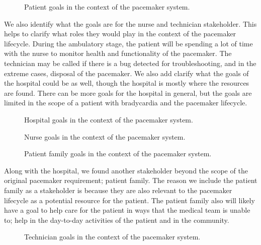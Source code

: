 \begin{figure}
	\centering
	
	\caption{Patient goals in the context of the pacemaker system.}
	\label{fig:patient_goals}
\end{figure}

We also identify what the goals are for the nurse and technician stakeholder. This helps to clarify what roles they would play in the context of the pacemaker lifecycle. During the ambulatory stage, the patient will be spending a lot of time with the nurse to monitor health and functionality of the pacemaker. The technician may be called if there is a bug detected for troubleshooting, and in the extreme cases, disposal of the pacemaker. We also add clarify what the goals of the hospital could be as well, though the hospital is mostly where the resources are found. There can be more goals for the hospital in general, but the goals are limited in the scope of a patient with bradycardia and the pacemaker lifecycle.

\begin{figure}
	\centering
	
	\caption{Hospital goals in the context of the pacemaker system.}
	\label{fig:hospital_goals}
\end{figure}

\begin{figure}
	\centering
	
	\caption{Nurse goals in the context of the pacemaker system.}
	\label{fig:nurse_goals}
\end{figure}

\begin{figure}
	\centering
	
	\caption{Patient family goals in the context of the pacemaker system.}
	\label{fig:patient_family_goals}
\end{figure}

Along with the hospital, we found another stakeholder beyond the scope of the original pacemaker requirement; patient family. The reason we include the patient family as a stakeholder is because they are also relevant to the pacemaker lifecycle as a potential resource for the patient. The patient family also will likely have a goal to help care for the patient in ways that the medical team is unable to; help in the day-to-day activities of the patient and in the community.

\begin{figure}
	\centering
	
	\caption{Technician goals in the context of the pacemaker system.}
	\label{fig:technician_goals}
\end{figure}

